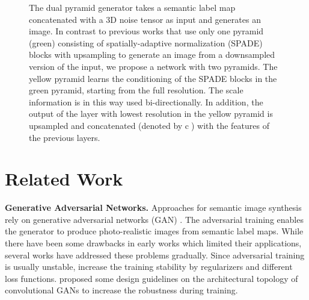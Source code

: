 \documentclass{bmvc2k}
\begin{document}
\begin{figure*}[t]
    \centering
    \caption{The dual pyramid generator takes a semantic label map concatenated with a 3D noise tensor as input and generates an image. In contrast to previous works that use only one pyramid (green) consisting of spatially-adaptive normalization (SPADE) blocks with upsampling to generate an image from a downsampled version of the input, we propose a network with two pyramids. The yellow pyramid learns the conditioning of the SPADE blocks in the green pyramid, starting from the full resolution. The scale information is in this way used bi-directionally. In addition, the output of the layer with lowest resolution in the yellow pyramid is upsampled and concatenated (denoted by \textcircled{c}) with the features of the previous layers.}
    \label{fig:gen}
    \vspace{-5mm}
\end{figure*}

\section{Related Work}

\textbf{Generative Adversarial Networks.} 
Approaches for semantic image synthesis rely on generative adversarial networks (GAN) \cite{goodfellow2014generative}.
The adversarial training enables the generator to produce photo-realistic images from semantic label maps.
While there have been some drawbacks in early works \cite{goodfellow2014generative} which limited their applications, several works have addressed these problems gradually. Since adversarial training is usually unstable, \cite{arjovsky2017wasserstein,salimans2016improved,mao2017least} increase the training stability by regularizers and different loss functions.
\cite{radford2015unsupervised} proposed some design guidelines on the architectural topology of convolutional GANs to increase the robustness during training.
\end{document}

